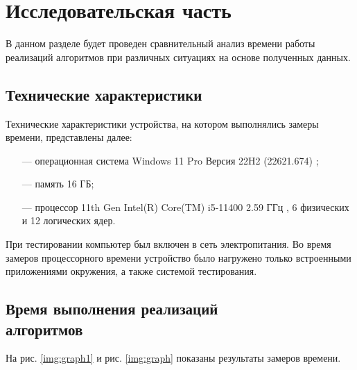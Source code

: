 \chapter{Исследовательская часть}

В данном разделе будет проведен сравнительный анализ времени работы реализаций алгоритмов при различных ситуациях на основе полученных данных.

\section{Технические характеристики}

Технические характеристики устройства, на котором выполнялись замеры времени, представлены далее:

\begin{itemize}[itemindent=1.25em]
	\item[---] операционная система Windows 11 Pro Версия 22H2 (22621.674) \cite{wind};
	\item[---] память 16 ГБ;
	\item[---] процессор 11th Gen Intel(R) Core(TM) i5-11400 2.59 ГГц \cite{proc}, 6 физических и 12 логических ядер.
\end{itemize}

При тестировании компьютер был включен в сеть электропитания. Во время замеров процессорного времени устройство было нагружено только встроенными приложениями окружения, а также системой тестирования.

\section[Время выполнения реализаций алгоритмов]{Время выполнения реализаций\\алгоритмов}

На рис. \ref{img:graph1} и рис. \ref{img:graph} показаны результаты замеров времени.

